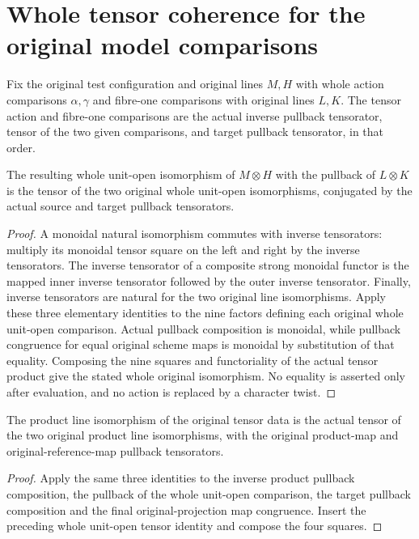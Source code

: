 \section{Whole tensor coherence for the original model comparisons}

Fix the original test configuration and original lines $M,H$ with whole
action comparisons $\alpha,\gamma$ and fibre-one comparisons with original
lines $L,K$.  The tensor action and fibre-one comparisons are the actual
inverse pullback tensorator, tensor of the two given comparisons, and
target pullback tensorator, in that order.

\begin{lemma}
\label{lem:native-tc-nef-fs-unit-open-tensor-coherence}
\leanok
{}
The resulting whole unit-open isomorphism of $M\otimes H$ with the
pullback of $L\otimes K$ is the tensor of the two original whole unit-open
isomorphisms, conjugated by the actual source and target pullback
tensorators.
\end{lemma}
\begin{proof}
A monoidal natural isomorphism commutes with inverse tensorators: multiply
its monoidal tensor square on the left and right by the inverse
tensorators.  The inverse tensorator of a composite strong monoidal
functor is the mapped inner inverse tensorator followed by the outer
inverse tensorator.  Finally, inverse tensorators are natural for the
two original line isomorphisms.  Apply these three elementary identities
to the nine factors defining each original whole unit-open comparison.
Actual pullback composition is monoidal, while pullback congruence for
equal original scheme maps is monoidal by substitution of that equality.
Composing the nine squares and functoriality of the actual tensor product
give the stated whole original isomorphism.  No equality is asserted
only after evaluation, and no action is replaced by a character twist.
\end{proof}

\begin{lemma}
\label{lem:native-tc-nef-fs-product-tensor-coherence}
\leanok
{}
The product line isomorphism of the original tensor data is the actual
tensor of the two original product line isomorphisms, with the original
product-map and original-reference-map pullback tensorators.
\end{lemma}
\begin{proof}
Apply the same three identities to the inverse product pullback
composition, the pullback of the whole unit-open comparison, the target
pullback composition and the final original-projection map congruence.
Insert the preceding whole unit-open tensor identity and compose the
four squares.
\end{proof}
